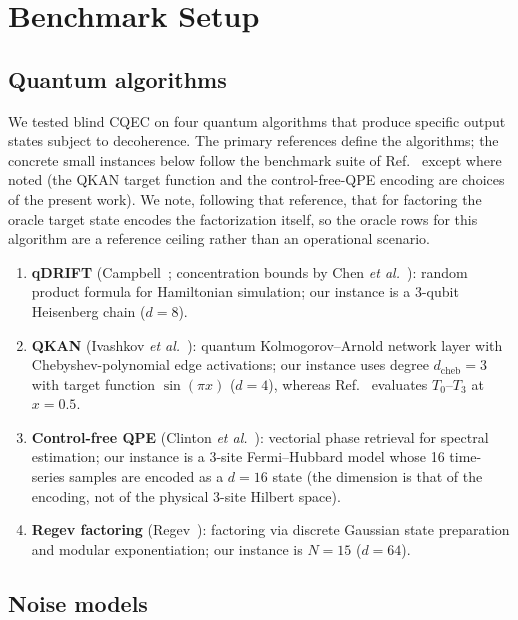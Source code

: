 \documentclass[pra,twocolumn,superscriptaddress,longbibliography,floatfix,nofootinbib]{revtex4-2}
\begin{document}
\section{Benchmark Setup}
\label{sec:setup}

\subsection{Quantum algorithms}
\label{sec:algorithms}

We tested blind CQEC on four quantum algorithms that produce specific output states subject to decoherence. The primary references define the algorithms; the concrete small instances below follow the benchmark suite of Ref.~\cite[Sec.~5]{Wakaura2026unified} except where noted (the QKAN target function and the control-free-QPE encoding are choices of the present work). We note, following that reference, that for factoring the oracle target state encodes the factorization itself, so the oracle rows for this algorithm are a reference ceiling rather than an operational scenario.

\begin{enumerate}
\item \textbf{qDRIFT} (Campbell~\cite{Campbell2019}; concentration bounds by Chen \emph{et al.}~\cite{Chen2021}): random product formula for Hamiltonian simulation; our instance is a 3-qubit Heisenberg chain ($d = 8$).
\item \textbf{QKAN} (Ivashkov \emph{et al.}~\cite{Ivashkov2024}): quantum Kolmogorov--Arnold network layer with Chebyshev-polynomial edge activations; our instance uses degree $d_\mathrm{cheb} = 3$ with target function $\sin(\pi x)$ ($d = 4$), whereas Ref.~\cite{Wakaura2026unified} evaluates $T_0$--$T_3$ at $x = 0.5$.
\item \textbf{Control-free QPE} (Clinton \emph{et al.}~\cite{Clinton2026}): vectorial phase retrieval for spectral estimation; our instance is a 3-site Fermi--Hubbard model whose 16 time-series samples are encoded as a $d = 16$ state (the dimension is that of the encoding, not of the physical 3-site Hilbert space).
\item \textbf{Regev factoring} (Regev~\cite{Regev2024}): factoring via discrete Gaussian state preparation and modular exponentiation; our instance is $N = 15$ ($d = 64$).
\end{enumerate}

\subsection{Noise models}
\label{sec:noise}
\end{document}
